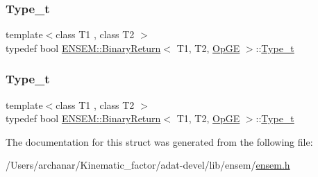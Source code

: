 \mbox{\label{structENSEM_1_1BinaryReturn_3_01T1_00_01T2_00_01OpGE_01_4_a8b2ef4a5b38d3f7cb5dc26a1fb4bdb89}} 
\subsubsection{\texorpdfstring{Type\_t}{Type\_t}\hspace{0.1cm}{\footnotesize\ttfamily [2/3]}}
{\footnotesize\ttfamily template$<$class T1 , class T2 $>$ \\
typedef bool \mbox{\hyperlink{structENSEM_1_1BinaryReturn}{E\+N\+S\+E\+M\+::\+Binary\+Return}}$<$ T1, T2, \mbox{\hyperlink{structENSEM_1_1OpGE}{Op\+GE}} $>$\+::\mbox{\hyperlink{structENSEM_1_1BinaryReturn_3_01T1_00_01T2_00_01OpGE_01_4_a8b2ef4a5b38d3f7cb5dc26a1fb4bdb89}{Type\+\_\+t}}}

\mbox{\label{structENSEM_1_1BinaryReturn_3_01T1_00_01T2_00_01OpGE_01_4_a8b2ef4a5b38d3f7cb5dc26a1fb4bdb89}} 
\subsubsection{\texorpdfstring{Type\_t}{Type\_t}\hspace{0.1cm}{\footnotesize\ttfamily [3/3]}}
{\footnotesize\ttfamily template$<$class T1 , class T2 $>$ \\
typedef bool \mbox{\hyperlink{structENSEM_1_1BinaryReturn}{E\+N\+S\+E\+M\+::\+Binary\+Return}}$<$ T1, T2, \mbox{\hyperlink{structENSEM_1_1OpGE}{Op\+GE}} $>$\+::\mbox{\hyperlink{structENSEM_1_1BinaryReturn_3_01T1_00_01T2_00_01OpGE_01_4_a8b2ef4a5b38d3f7cb5dc26a1fb4bdb89}{Type\+\_\+t}}}



The documentation for this struct was generated from the following file\+:\begin{DoxyCompactItemize}
\item 
/\+Users/archanar/\+Kinematic\+\_\+factor/adat-\/devel/lib/ensem/\mbox{\hyperlink{adat-devel_2lib_2ensem_2ensem_8h}{ensem.\+h}}\end{DoxyCompactItemize}
